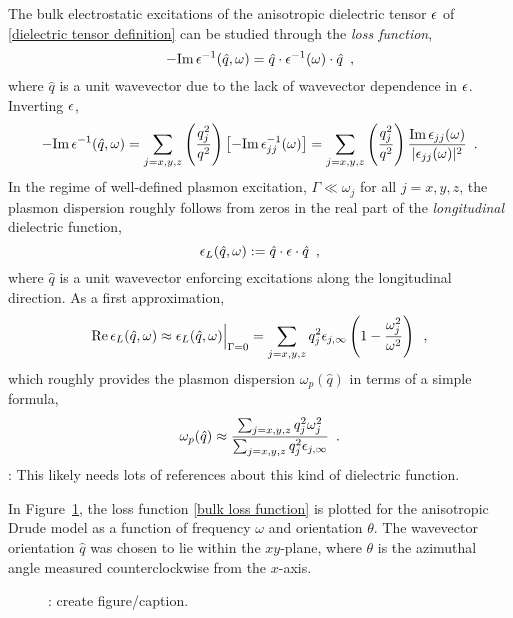The bulk electrostatic excitations of the anisotropic dielectric tensor $\epsilon$ of \eqref{dielectric tensor definition} can be studied through the {\it loss function},
\begin{equation}
    -\text{Im}\, \epsilon^{-1}(\hat q, \omega) = \hat q \cdot \epsilon^{-1}(\omega) \cdot \hat q
    \,\,\,,
\end{equation}
where $\hat q$ is a unit wavevector due to the lack of wavevector dependence in $\epsilon$.  Inverting $\epsilon$,
\begin{equation}
    \label{bulk loss function}
    -\text{Im}\,\epsilon^{-1}(\hat q, \omega) = \sum_{j=x,y,z} \left(\frac{q_j^2}{q^2}\right) \left[ -\text{Im}\,\epsilon_{jj}^{-1}(\omega)\right]
    =
    \sum_{j=x,y,z}\left(\frac{q_j^2}{q^2}\right)\frac{\text{Im}\,\epsilon_{jj}(\omega)}{|\epsilon_{jj}(\omega)|^2}
    \,\,\,.
\end{equation}
In the regime of well-defined plasmon excitation, $\Gamma \ll \omega_j$ for all $j=x,y,z$, the plasmon dispersion roughly follows from zeros in the real part of the {\it longitudinal} dielectric function,
\begin{equation}
    \epsilon_L(\hat q,\omega) :=\hat q\cdot \epsilon\cdot\hat q\,\,\,,
\end{equation}
where $\hat q$ is a unit wavevector enforcing excitations along the longitudinal direction.  As a first approximation,
\begin{equation}
    \label{longitudinal dielectric function without damping}
    \text{Re}\,\epsilon_L(\hat q, \omega) \approx \epsilon_L(\hat q, \omega)\Big|_{\Gamma = 0}
    =
    \sum_{j=x,y,z}q_j^2\epsilon_{j,\infty}\left(1 - \frac{\omega_j^2}{\omega^2}\right)
    \,\,\,,
\end{equation}
which roughly provides the plasmon dispersion $\omega_p(\hat q)$ in terms of a simple formula,
\begin{equation}
    \omega_p(\hat q) \approx 
    \frac{\sum_{j=x,y,z}q_j^2 \omega_j^2}{\sum_{j=x,y,z}q_j^2 \epsilon_{j,\infty}}
    \,\,\,.
\end{equation}
: This likely needs lots of references about this kind of dielectric function.

In Figure~\ref{figure: anisotropic plasmon spectrum}, the loss function \eqref{bulk loss function} is plotted for the anisotropic Drude model as a function of frequency $\omega$ and orientation $\theta$.  The wavevector orientation $\hat q$ was chosen to lie within the $xy$-plane, where $\theta$ is the azimuthal angle measured counterclockwise from the $x$-axis.  

\begin{figure}
    \centering
    \caption{
        : create figure/caption.
    }
    \label{figure: anisotropic plasmon spectrum}
\end{figure}
